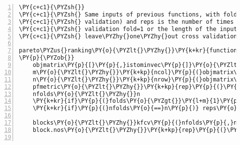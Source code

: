 \begin{Verbatim}[commandchars=\\\{\},codes={\catcode`\$=3\catcode`\^=7\catcode`\_=8},gobble=0,numbers=left,fontfamily=fvm,fontshape=n,fontsize=\footnotesize,tabsize=2]
\PY{c+c1}{\PYZsh{}}
\PY{c+c1}{\PYZsh{} Same inputs of previous functions, with folds (aka $k$\PYZhy{}fold cross  }
\PY{c+c1}{\PYZsh{} validation) and reps is the number of times we re\PYZhy{}do the cross }
\PY{c+c1}{\PYZsh{} validation fold=1 or the length of the input (i.e. n) creates }
\PY{c+c1}{\PYZsh{} leave\PYZhy{}one\PYZhy{}out cross validation}

pareto\PYZus{}ranking\PY{o}{\PYZlt{}\PYZhy{}}\PY{k+kr}{function}\PY{p}{(}objmatrix\PY{p}{,}istominvec\PY{p}{,}noFronts\PY{o}{=}\PY{l+m}{20}\PY{p}{,}folds\PY{o}{=}\PY{l+m}{1}\PY{p}{,}reps\PY{o}{=}\PY{l+m}{5}\PY{p}{)}
\PY{p}{\PYZob{}}
	objmatrix\PY{p}{[}\PY{p}{,}istominvec\PY{p}{]}\PY{o}{\PYZlt{}\PYZhy{}} \PY{o}{\PYZhy{}}objmatrix\PY{p}{[}\PY{p}{,}istominvec\PY{p}{]}
	m\PY{o}{\PYZlt{}\PYZhy{}}\PY{k+kp}{ncol}\PY{p}{(}objmatrix\PY{p}{)}
	n\PY{o}{\PYZlt{}\PYZhy{}}\PY{k+kp}{nrow}\PY{p}{(}objmatrix\PY{p}{)}
	pfmetric\PY{o}{\PYZlt{}\PYZhy{}}\PY{k+kp}{rep}\PY{p}{(}\PY{l+m}{0}\PY{p}{,}n\PY{p}{)} \PY{c+c1}{\PYZsh{}output vector}
	nfolds\PY{o}{\PYZlt{}\PYZhy{}}n
	\PY{k+kr}{if}\PY{p}{(}folds\PY{o}{\PYZgt{}}\PY{l+m}{1}\PY{p}{)} nfolds\PY{o}{\PYZlt{}\PYZhy{}}folds
	\PY{k+kr}{if}\PY{p}{(}nfolds\PY{o}{==}n\PY{p}{)} reps\PY{o}{\PYZlt{}\PYZhy{}}\PY{l+m}{1}
	
	blocks\PY{o}{\PYZlt{}\PYZhy{}}kfcv\PY{p}{(}nfolds\PY{p}{,}n\PY{p}{)}
	block.nos\PY{o}{\PYZlt{}\PYZhy{}}\PY{k+kp}{rep}\PY{p}{(}\PY{l+m}{1}\PY{o}{:}nfolds\PY{p}{,}blocks\PY{p}{)}
	

\end{Verbatim}
